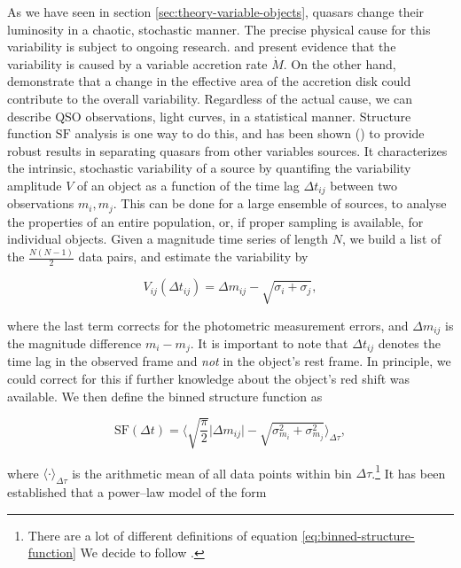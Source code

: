 As we have seen in section \ref{sec:theory-variable-objects}, quasars change their luminosity in a chaotic, stochastic manner. The precise physical cause for this variability is subject to ongoing research. \citet{pereyra2006} and \citet{li2008} present evidence that the variability is caused by a variable accretion rate $\dot M$. On the other hand, \citet{blackburne2010} demonstrate that a change in the effective area of the accretion disk could contribute to the overall variability. Regardless of the actual cause, we can describe QSO observations, \eg light curves, in a statistical manner. Structure function $\text{SF}$ analysis \citep{hughes1992,collier2001} is one way to do this, and has been shown (\eg \citet{schmidt2010}) to provide robust results in separating quasars from other variables sources. It characterizes the intrinsic, stochastic variability of a source by quantifing the variability amplitude $V$ of an object as a function of the time lag $\Delta t_{ij}$ between two observations $m_i, m_j$. This can be done for a large ensemble of sources, to analyse the properties of an entire population, or, if proper sampling is available, for individual objects. Given a magnitude time series of length $N$, we build a list of the $\frac{N(N-1)}{2}$ data pairs, and estimate the variability by

\begin{equation}
V_{ij}(\Delta t_{ij}) = \Delta m_{ij} - \sqrt{\sigma_i + \sigma_j},
\end{equation}

where the last term corrects for the photometric measurement errors, and $\Delta m_{ij}$ is the magnitude difference $m_i - m_j$. It is important to note that $\Delta t_{ij}$ denotes the time lag in the observed frame and \emph{not} in the object's rest frame. In principle, we could correct for this if further knowledge about the object's red shift was available. We then define the binned structure function as

\begin{equation}
\text{SF}(\Delta t) = \big\langle \sqrt{\frac{\pi}{2}} \big| \Delta m_{ij}  \big| - \sqrt{\sigma_{m_i}^2 + \sigma_{m_j}^2} \big\rangle_{\Delta \tau},
\label{eq:binned-structure-function}
\end{equation}

where $\langle \cdot \rangle_{\Delta \tau}$ is the arithmetic mean of all data points within bin $\Delta \tau$.\footnote{There are a lot of different definitions of equation \eqref{eq:binned-structure-function} We decide to follow \citet{schmidt2010}.} It has been established \citep{richards2006} that a power--law model of the form

